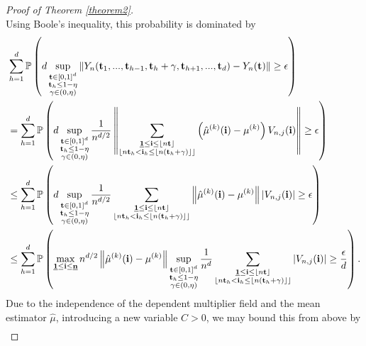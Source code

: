 \begin{proof}[Proof of Theorem \ref{theorem2}]
\[    \]
    Using Boole's inequality, this probability is dominated by
    \begin{align*}
        & \sum\limits_{h=1}^d \PP\left(d \sup\limits_{\substack{\mathbf{t} \in [0,1]^d \\ \mathbf{t}_h \leq 1 - \eta \\ \gamma \in (0,\eta)}} \| Y_n(\mathbf{t}_1, ..., \mathbf{t}_{h-1}, \mathbf{t}_h + \gamma, \mathbf{t}_{h+1}, ..., \mathbf{t}_d) - Y_n(\mathbf{t}) \| \geq \epsilon\right) \\
        & = \sum\limits_{h=1}^d \PP\left(d \sup\limits_{\substack{\mathbf{t} \in [0,1]^d \\ \mathbf{t}_h \leq 1 - \eta \\ \gamma \in (0,\eta)}} \frac{1}{n^{d/2}} \left\| \sum\limits_{\substack{\usbf[1] \leq \mathbf{i} \leq \floor{n \mathbf{t}} \\ \floor{n \mathbf{t}_h < \mathbf{i}_h \leq \floor{n(\mathbf{t}_h+\gamma)}}}} \left( \hat{\mu}^{(k)}(\mathbf{i}) - \mu^{(k)} \right) V_{n, j}(\mathbf{i}) \right\| \geq \epsilon\right) \\
        & \leq \sum\limits_{h=1}^d \PP\left(d \sup\limits_{\substack{\mathbf{t} \in [0,1]^d \\ \mathbf{t}_h \leq 1 - \eta \\ \gamma \in (0,\eta)}} \frac{1}{n^{d/2}}  \sum\limits_{\substack{\usbf[1] \leq \mathbf{i} \leq \floor{n \mathbf{t}} \\ \floor{n \mathbf{t}_h < \mathbf{i}_h \leq \floor{n(\mathbf{t}_h+\gamma)}}}} \left\| \hat{\mu}^{(k)}(\mathbf{i}) - \mu^{(k)} \right\| \left| V_{n, j}(\mathbf{i}) \right|  \geq \epsilon\right) \\
        & \leq \sum\limits_{h=1}^d \PP\left( \max\limits_{\usbf[1] \leq \mathbf{i} \leq \usbf[n]} n^{d/2} \left\| \hat{\mu}^{(k)}(\mathbf{i}) - \mu^{(k)} \right\| \sup\limits_{\substack{\mathbf{t} \in [0,1]^d \\ \mathbf{t}_h \leq 1 - \eta \\ \gamma \in (0,\eta)}} \frac{1}{n^{d}} \sum\limits_{\substack{\usbf[1] \leq \mathbf{i} \leq \floor{n \mathbf{t}} \\ \floor{n \mathbf{t}_h < \mathbf{i}_h \leq \floor{n(\mathbf{t}_h+\gamma)}}}}  \left| V_{n, j}(\mathbf{i}) \right|  \geq \frac{\epsilon}{d}\right).
    \end{align*}
    Due to the independence of the dependent multiplier field and the mean estimator $\hat{\mu}$, introducing a new variable $C > 0$, we may bound this from above by
    \begin{align*}

\end{align*}
\end{proof}
